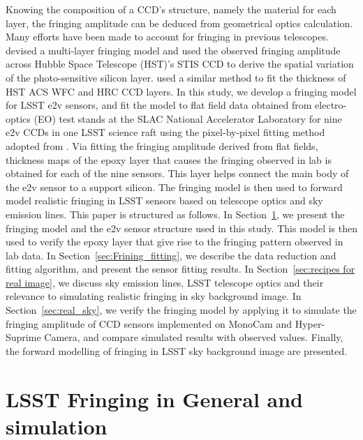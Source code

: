 \documentclass[twocolumn]{aastex63} %
\begin{document}
\begin{CJK*}{UTF8}{gbsn}
Knowing the composition of a CCD's structure, namely the material for each layer, the fringing amplitude can be deduced from geometrical optics calculation. Many efforts have been made to account for fringing in previous telescopes. \citet{Malumuth03} devised a multi-layer fringing model and used the observed fringing amplitude across Hubble Space Telescope (HST)'s STIS CCD to derive the spatial variation of the photo-sensitive silicon layer. \citet{Walsh03} used a similar method to fit the thickness of HST ACS WFC and HRC CCD layers. In this study, we develop a fringing model for LSST e2v sensors, and fit the model to flat field data obtained from electro-optics (EO) test stands at the SLAC National Accelerator Laboratory for nine e2v CCDs in one LSST science raft using the pixel-by-pixel fitting method adopted from \citet{Malumuth03}. Via fitting the fringing amplitude derived from flat fields, thickness maps of the epoxy layer that causes the fringing observed in lab is obtained for each of the nine sensors. This layer helps connect the main body of the e2v sensor to a support silicon. The fringing model is then used to forward model realistic fringing in LSST sensors based on telescope optics and sky emission lines. This paper is structured as follows. In Section~\ref{sec: LSST_fringe_general}, we present the fringing model and the e2v sensor structure used in this study.  This model is then used to verify the epoxy layer that give rise to the fringing pattern observed in lab data. In Section~\ref{sec:Frining_fitting}, we describe the data reduction and fitting algorithm, and present the sensor fitting results. In Section~\ref{sec:recipes for real image}, we discuss sky emission lines, LSST telescope optics and their relevance to  simulating realistic fringing in sky background image. In Section~\ref{sec:real_sky}, we verify the fringing model by applying it to simulate the fringing amplitude of CCD sensors  implemented on MonoCam and Hyper-Suprime Camera, and compare simulated results with observed values. Finally, the forward modelling of fringing in LSST sky background image are presented. 


\section{LSST Fringing in General and simulation} \label{sec: LSST_fringe_general}


\end{CJK*}
\end{document}
